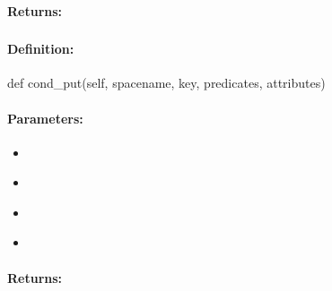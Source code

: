 \paragraph{Returns:}


\pagebreak
\subsubsection{}
\label{api:python:cond_put}


\paragraph{Definition:}
\begin{pythoncode}
def cond_put(self, spacename, key, predicates, attributes)
\end{pythoncode}

\paragraph{Parameters:}
\begin{itemize}[noitemsep]
\item {}\\

\item {}\\

\item {}\\

\item {}\\

\end{itemize}

\paragraph{Returns:}


\pagebreak
\subsubsection{}
\label{api:python:async_cond_put}


